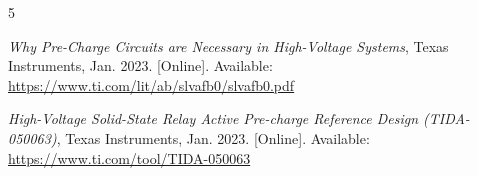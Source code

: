 \documentclass{article}
\begin{document}
\begin{thebibliography}{5}

\textit{Why Pre-Charge Circuits are Necessary in High-Voltage Systems}, Texas Instruments, Jan. 2023. [Online]. Available: \url{https://www.ti.com/lit/ab/slvafb0/slvafb0.pdf}

\textit{High-Voltage Solid-State Relay Active Pre-charge Reference Design (TIDA-050063)}, Texas Instruments, Jan. 2023. [Online]. Available: \url{https://www.ti.com/tool/TIDA-050063}

\end{thebibliography}
\end{document}
